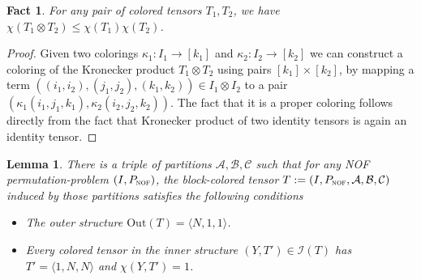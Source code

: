 \documentclass[10pt,a4paper]{article}
\newtheorem{fact}[theorem]{Fact}
\newtheorem{lemma}[theorem]{Lemma}
\newcommand{\cI}{\mathcal{I}}
\newcommand{\Inn}{\cI}
\newcommand{\Out}{\mathrm{Out}}
\newcommand{\mmP}{P_{\textsc{nof}}}
\newcommand{\inprod}[1]{\langle #1 \rangle}
\begin{document}
\begin{fact}
\label{fct:chromatic-numbers-product}
For any pair of colored tensors $T_1, T_2$, we have $\chi(T_1 \otimes T_2) \leq \chi(T_1) \chi(T_2)$.
\end{fact}
\begin{proof}
    Given two colorings $\kappa_1 : I_1 \to [k_1]$ and $\kappa_2 : I_2 \to [k_2]$ we can construct a coloring of the Kronecker product $T_1 \otimes T_2$ using pairs $[k_1] \times [k_2]$, by mapping a term $( (i_1, i_2), (j_1, j_2), (k_1, k_2)) \in I_1 \otimes I_2$ to a pair $(\kappa_1(i_1, j_1, k_1), \kappa_2(i_2,j_2,k_2))$. The fact that it is a proper coloring follows directly from the fact that Kronecker product of two identity tensors is again an identity tensor.
\end{proof}

\begin{lemma}
\label{lem:block-perm}
There is a triple of partitions $\mathcal{A}, \mathcal{B}, \mathcal{C}$ such that for any NOF permutation-problem $(I,\mmP)$, the block-colored tensor $T := (I, \mmP, \mathcal{A}, \mathcal{B}, \mathcal{C})$ induced by those partitions satisfies the following conditions
\begin{itemize}
    \item The outer structure $\Out(T) = \inprod{N, 1, 1}$.
    \item Every colored tensor in the inner structure $(Y, T') \in \Inn(T)$ has $T' = \inprod{1,N,N}$ and $\chi(Y, T') = 1$.
\end{itemize}
\end{lemma} 
\end{document}
